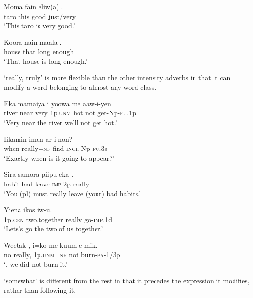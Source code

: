 \ea%
\label{ex:3:x508}
\gll Moma fain eliw(a) . \\
taro this good just/very \\
\glt`This taro is very good.'
\z

\ea%
\label{ex:3:x510}
\gll Koora nain maala . \\
house that long enough\\
\glt`That house is long enough.'
\z

 `really, truly' is more flexible than the other intensity adverbs in that it can modify a word belonging to almost any word class.

\ea%
\label{ex:3:x706}
\gll Eka mamaiya  i yoowa me aaw-i-yen \\
river near very 1p.\textsc{unm} hot not get-Np-\textsc{fu}.1p\\
\glt`Very near the river we'll not get hot.'
\z

\ea%
\label{ex:3:x708}
\gll Iikamin  imen-ar-i-non? \\
when really=\textsc{nf} find-\textsc{inch}-Np-\textsc{fu}.3s\\
\glt`Exactly when is it going to appear?'
\z

\ea%
\label{ex:3:x709}
\gll Sira samora piipu-eka . \\
habit bad leave-\textsc{imp}.2p really\\
\glt`You (pl) must really leave (your) bad habits.'
\z

\ea%
\label{ex:3:x710}
\gll Yiena ikos  iw-u. \\
1p.\textsc{gen} two.together really go-\textsc{imp}.1d\\
\glt`Lets's go  the two of us together.'
\z

\ea%
\label{ex:3:x1875}
\gll Weetak , i=ko me kuum-e-mik. \\
no really, 1p.\textsc{unm}=\textsc{nf} not burn-\textsc{pa}-1/3p\\
\glt`, we did not burn it.'
\z

 `somewhat' is different from the rest in that it precedes the expression it modifies, rather than following it.

